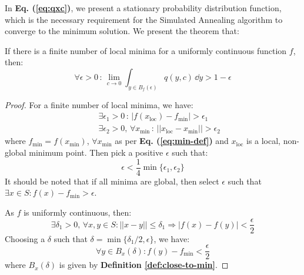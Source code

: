 In \textbf{Eq. (\ref{eq:qxc})}, we present a stationary probability distribution function, which is the necessary requirement for the Simulated Annealing algorithm to converge to the minimum solution. We present the theorem that:
\begin{theorem}
If there is a finite number of local minima for a uniformly continuous function $f$, then:
\begin{equation}
    \forall \epsilon > 0 \, : \, \lim_{c \rightarrow 0} \int_{y \in B_f(\epsilon)} q(y,c) \, \dd y > 1-\epsilon
\end{equation}
\label{thm:convergence-sa}
\begin{proof}
For a finite number of local minima, we have:
\begin{eqnarray}
    && \exists \epsilon_1 > 0 \, : \, |f(x_{\text{loc}}) - f_{\min}| > \epsilon_1 \\
    && \exists \epsilon_2 > 0, \, \forall x_{\min} \, : \, ||x_{\text{loc}} - x_{\min}|| > \epsilon_2 
    \label{eqn:x-loc-x-min}
\end{eqnarray}
where $f_{\min} = f(x_{\min})$, $\forall x_{\min}$ as per \textbf{Eq. (\ref{eq:min-def})} and $x_{\text{loc}}$ is a local, non-global minimum point. Then pick a positive $\epsilon$ such that: 
\begin{equation}
    \epsilon < \dfrac{1}{4}\min \{ \epsilon_1, \epsilon_2 \}
    \label{eqn:eps-one-fourth-min}
\end{equation}
It should be noted that if all minima are global, then select $\epsilon$ such that $\exists x \in S : f(x) - f_{\min} > \epsilon$. \vspace{5pt}

\noindent As $f$ is uniformly continuous, then:
\begin{equation}
    \exists \delta_1 > 0, \, \forall x,y \in S : ||x-y|| \leq \delta_1 \Longrightarrow |f(x)-f(y)| < \dfrac{\epsilon}{2}
\end{equation}
Choosing a $\delta$ such that $\delta = \min \{ \delta_1/2, \epsilon \}$, we have:
\begin{equation}
    \forall y \in B_x(\delta) : f(y) - f_{\min} < \dfrac{\epsilon}{2}
\end{equation}
where $B_x(\delta)$ is given by \textbf{Definition \ref{def:close-to-min}}. \vspace{5pt}


\end{proof}
\end{theorem}
